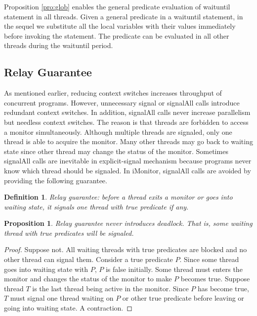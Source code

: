 \documentclass[preprint]{sigplanconf}
\newtheorem{definition}{Definition}
\newtheorem{proposition}{Proposition}
\begin{document}
Proposition \ref{pro:glob} enables the general predicate evaluation of
waituntil statement in all threads. 
Given a general predicate in a waituntil statement, in the sequel we substitute
all the local variables with their values immediately before invoking the
statement. The predicate can be evaluated in all other threads during the
waituntil period. 

\subsection{Relay Guarantee}
As mentioned earlier, reducing context switches increases throughput of
concurrent programs. However, unnecessary signal or signalAll calls introduce
redundant context switches. In addition, signalAll calls never increase 
parallelism but needless context switches. The reason is that threads are 
forbidden to access a monitor simultaneously. Although multiple threads are
signaled, only one thread is able to acquire the monitor. Many other threads
may go back to waiting state since other thread may change the status of the 
monitor. Sometimes signalAll calls are inevitable in explicit-signal 
mechanism because programs never know which thread should be signaled. In
iMonitor, signalAll calls are avoided by providing the following guarantee. 

\begin{definition}{Relay guarantee:}
    before a thread exits a monitor or goes into waiting state, it
    signals one thread with true predicate if any.
\end{definition}
\begin{proposition} \label{pro:one}
    Relay guarantee never introduces deadlock. That is,
    some waiting thread with true predicates will be signaled. 
\end{proposition}
\begin{proof}
    Suppose not. All waiting threads with true predicates are blocked and 
    no other thread can signal them. Consider a true predicate $P$. Since some
    thread goes into waiting state with $P$, $P$ is false initially. Some 
    thread must enters the monitor and changes the status of the monitor to
    make $P$ becomes true. Suppose thread $T$ is the last thread being active 
    in the monitor. Since $P$ has become true, $T$ must signal one thread
    waiting on $P$ or other true predicate before leaving or 
    going into waiting state. A contraction. 
 \end{proof}
\end{document}
